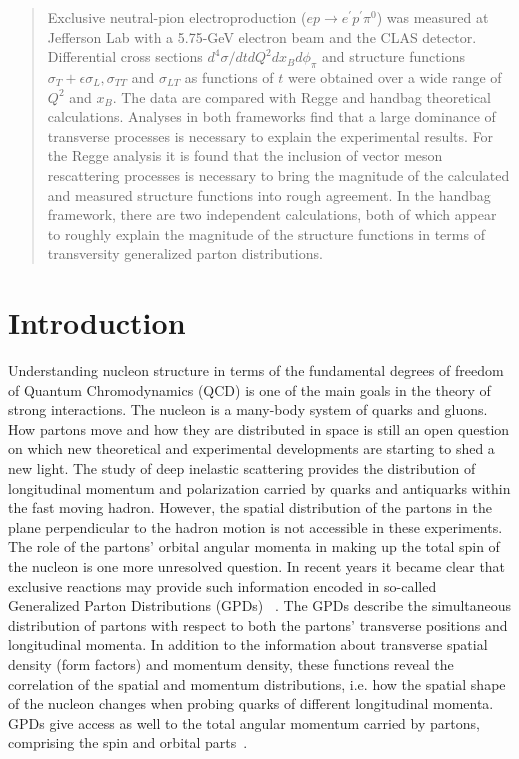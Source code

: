 \documentclass[prc,floatfix,twocolumn,superscriptaddress,letter]{revtex4}
\begin{document}
\begin{abstract}
Exclusive neutral-pion electroproduction ($ep\to e^\prime p^\prime \pi^0$) was measured at Jefferson Lab with a 5.75-GeV electron beam and the CLAS detector. Differential cross sections $d^4\sigma/dtdQ^2dx_Bd\phi_\pi$  and structure functions $\sigma_T+\epsilon\sigma_L, \sigma_{TT}$ and $\sigma_{LT}$ as functions of $t$ were obtained over a wide range of $Q^2$ and $x_B$. The data are compared with Regge and handbag theoretical calculations. Analyses in both  frameworks  find  that a large dominance of transverse processes is necessary to explain the experimental results.  For the Regge analysis it is found that the inclusion of vector meson rescattering processes is necessary to bring the magnitude of the calculated and measured structure functions into rough agreement. In the  handbag framework, there are two independent  calculations, both of which appear to roughly explain the magnitude of the structure functions in terms of transversity generalized parton distributions. 
\end{abstract}

\date{\today}

\maketitle




\section{Introduction}

Understanding nucleon structure in terms of the fundamental degrees of freedom of Quantum Chromodynamics (QCD) is one of the main goals in the theory of strong interactions.  The nucleon is a many-body system of quarks and gluons. How partons move and how they are distributed in space is still an open question on which new theoretical and experimental developments are starting to shed a new light. The study of deep inelastic scattering provides the distribution of longitudinal momentum and polarization carried by quarks and antiquarks within the fast moving hadron.  However, the spatial distribution of the partons in the plane perpendicular to the hadron motion is not accessible in these experiments. The role of the partons' orbital angular momenta in making up the total spin of the nucleon is one more unresolved question. In recent years it became clear that  exclusive reactions may provide such  information encoded in so-called Generalized Parton Distributions (GPDs) ~\cite{Ji,Radyushkin}. The GPDs describe the simultaneous distribution of partons with respect to both the partons'  transverse positions and longitudinal momenta. In addition to the information about  transverse  spatial density (form factors) and momentum density, these functions reveal the correlation of the spatial and momentum distributions, i.e. how the spatial shape of the nucleon changes when probing quarks of different longitudinal momenta. GPDs give access as well to the total angular momentum carried by partons, comprising the spin and orbital parts~\cite{Ji}.
\end{document}
